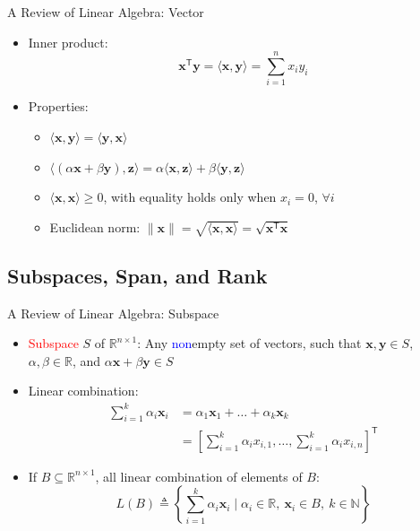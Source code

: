\documentclass[aspectratio=169,hyperref,UTF8,CJK]{beamer}
\newcommand{\R}{\mathbb{R}}
\newcommand{\trans}{\mathsf{T}}
\newcommand{\vect}[1]{\boldsymbol{#1}}
\begin{document}
\begin{frame}{A Review of Linear Algebra: Vector}
  \begin{itemize}
    \item Inner product:
      \begin{equation*}
        \vect{x}^{\trans}\vect{y}=\langle\vect{x},\vect{y}\rangle
        =\sum_{i=1}^{n}x_i y_i
      \end{equation*}
    \item Properties:
      \begin{itemize}
        \item $\langle\vect{x},\vect{y}\rangle=\langle\vect{y},\vect{x}\rangle$
        \item $\langle(\alpha\vect{x}+\beta\vect{y}),\vect{z}\rangle
          =\alpha\langle\vect{x},\vect{z}\rangle+\beta\langle\vect{y},\vect{z}\rangle$
        \item $\langle\vect{x},\vect{x}\rangle\ge0$, with equality holds only when $x_i=0$, $\forall i$
        \item Euclidean norm: $\lVert\vect{x}\rVert=\sqrt{\langle\vect{x},\vect{x}\rangle}=\sqrt{\vect{x}^{\trans}\vect{x}}$
      \end{itemize}
  \end{itemize}
\end{frame}

\subsection{Subspaces, Span, and Rank}

\begin{frame}{A Review of Linear Algebra: Subspace}
  \footnotesize
  \begin{itemize}
    \item \textcolor{red}{Subspace} $S$ of $\R^{n\times1}$: Any \textcolor{blue}{non}empty set of vectors, such that $\vect{x},\vect{y}\in S$, $\alpha,\beta\in\R$, and $\alpha\vect{x}+\beta\vect{y}\in S$
    \item Linear combination:
      \begin{align*}
        \sum_{i=1}^{k}\alpha_i\vect{x}_i
        &=\alpha_1\vect{x}_1+\ldots+\alpha_k\vect{x}_k\\
        &=\left[\sum_{i=1}^{k}\alpha_i x_{i,1},\ldots,
          \sum_{i=1}^{k}\alpha_i x_{i,n}\right]^{\trans}
      \end{align*}
    \item If $B\subseteq\R^{n\times1}$, all linear combination of elements of $B$:
      \begin{equation*}
        L(B)\triangleq\left\{\sum_{i=1}^{k}\alpha_i\vect{x}_i
        \mid \alpha_i\in\R,\ \vect{x}_i\in B,\ k\in\mathbb{N}\right\}
      \end{equation*}
  \end{itemize}
\end{frame}
\end{document}
